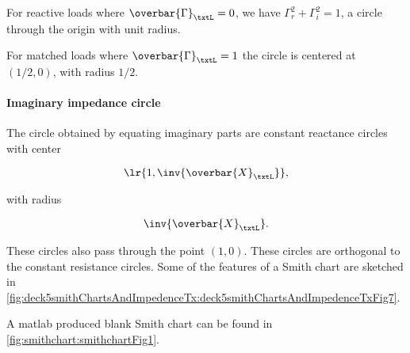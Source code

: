 For reactive loads where \( \overbar{\Gamma}_\txtL = 0 \), we have \( \Gamma_r^2 + \Gamma_i^2 = 1 \), a circle through the origin with unit radius.

For matched loads where \( \overbar{\Gamma}_\txtL = 1 \) the circle is centered at \( (1/2, 0) \), with radius \( 1/2 \).

\paragraph{Imaginary impedance circle}

The circle obtained by equating imaginary parts are constant reactance circles with center

\begin{equation}\label{eqn:uwavesDeck5SmithChartCore:640}
\lr{ 1, \inv{\overbar{X}_\txtL } },
\end{equation}

with radius

\begin{equation}\label{eqn:uwavesDeck5SmithChartCore:660}
\inv{\overbar{X}_\txtL}.
\end{equation}

These circles also pass through the point \( (1,0) \).  These circles are orthogonal to the constant resistance circles.  Some of the features of a Smith chart are sketched in \cref{fig:deck5smithChartsAndImpedenceTx:deck5smithChartsAndImpedenceTxFig7}.


A matlab produced blank Smith chart can be found in \cref{fig:smithchart:smithchartFig1}.


